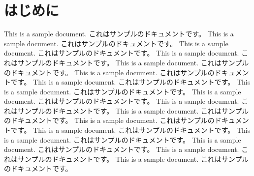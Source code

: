 \documentclass[
  luatex,
  paper=a4paper,
  fontsize=11pt,
  twocolumn,
  jlreq_notes,
]{jlreq}
\begin{document}

\section{はじめに}

This is a sample document.
これはサンプルのドキュメントです。
This is a sample document.
これはサンプルのドキュメントです。
This is a sample document.
これはサンプルのドキュメントです。
This is a sample document.
これはサンプルのドキュメントです。
This is a sample document.
これはサンプルのドキュメントです。
This is a sample document.
これはサンプルのドキュメントです。
This is a sample document.
これはサンプルのドキュメントです。
This is a sample document.
これはサンプルのドキュメントです。
This is a sample document.
これはサンプルのドキュメントです。
This is a sample document.
これはサンプルのドキュメントです。
This is a sample document.
これはサンプルのドキュメントです。
This is a sample document.
これはサンプルのドキュメントです。
This is a sample document.
これはサンプルのドキュメントです。
This is a sample document.
これはサンプルのドキュメントです。
This is a sample document.
これはサンプルのドキュメントです。
This is a sample document.
これはサンプルのドキュメントです。
This is a sample document.
これはサンプルのドキュメントです。



\end{document}
